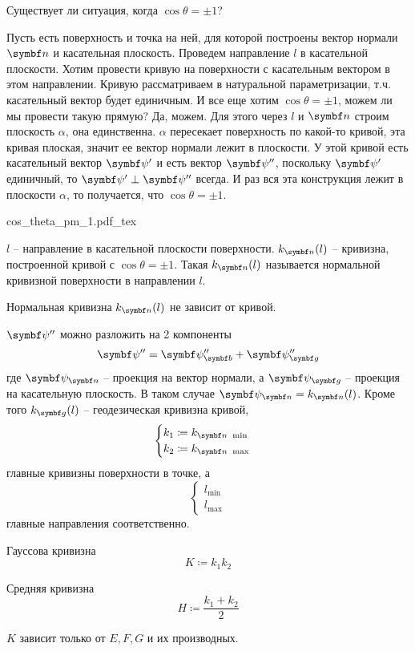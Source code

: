 \documentclass[main]{subfiles}
\begin{document}
Существует ли ситуация, когда $\cos\theta = \pm 1$?

Пусть есть поверхность и точка на ней, для которой построены вектор нормали $\vn$ и касательная плоскость.
Проведем направление $l$  в касательной плоскости.
Хотим провести кривую на поверхности с касательным вектором в этом направлении.
Кривую рассматриваем в натуральной параметризации, т.ч. касательный вектор будет единичным.
И все еще хотим  $\cos\theta = \pm 1$, можем ли мы провести такую прямую?
Да, можем.
Для этого через $l$ и $\vn$ строим плоскость $\alpha$, она единственна.
$\alpha$ пересекает поверхность по какой-то кривой, эта кривая плоская, значит ее вектор нормали лежит в плоскости.
У этой кривой есть касательный вектор $\vpsi'$ и есть вектор $\vpsi''$, поскольку $\vpsi'$ единичный, то $\vpsi' \perp \vpsi''$ всегда.
И раз вся эта конструкция лежит в плоскости $\alpha$, то получается, что $\cos\theta = \pm 1$.
\begin{center}
    {cos_theta_pm_1.pdf_tex}
\end{center}

\begin{definition}
    $l$ -- направление в касательной плоскости поверхности.
    $k_{\vn}(l)$ -- кривизна, построенной кривой с $\cos\theta = \pm 1$.
    Такая $k_{\vn}(l)$ называется нормальной кривизной поверхности в направлении $l$.
\end{definition}
\begin{theorem}[Мёнье]
    Нормальная кривизна $k_{\vn}(l)$ не зависит от кривой.
\end{theorem}

$\vpsi''$ можно разложить на 2 компоненты
\[\vpsi'' = \vpsi''_{\vb} + \vpsi''_{\vg}\]
где $\vpsi_{\vn}$ -- проекция на вектор нормали, а $\vpsi_{\vg}$ -- проекция на касательную плоскость.
В таком случае $\vpsi_{\vn} = k_{\vn}(l)$.
Кроме того $k_{\vg}(l)$ -- геодезическая кривизна кривой,
\[\begin{cases}
        k_1 \coloneqq k_{\vn\ \min} \\
        k_2 \coloneqq k_{\vn\ \max}
    \end{cases}\]
главные кривизны поверхности в точке, а
\[\begin{cases}
        l_{\min} \\
        l_{\max}
    \end{cases}\]
главные направления соответственно.

\begin{definition}
    Гауссова кривизна
    \[K \coloneqq k_1k_2 \]
\end{definition}
\begin{definition}
    Средняя кривизна
    \[H \coloneqq \frac{k_1 + k_2}{2}\]
\end{definition}
\begin{theorem}
    $K$ зависит только от $E,F,G$ и их производных.
\end{theorem}
\end{document}
